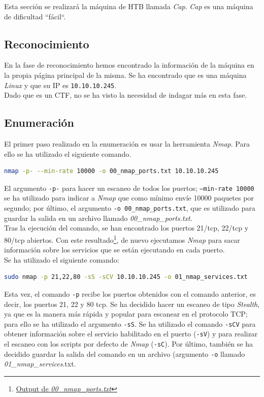 Esta sección se realizará la máquina de \acrlong{HTB} llamada \textit{Cap}\cite{cap}. \textit{Cap} es una máquina de dificultad ``fácil``.

\subsection{Reconocimiento}
En la fase de reconocimiento hemos encontrado la información de la máquina en la propia página principal\cite{cap} de la misma. Se ha encontrado que es una máquina \textit{Linux} y que su IP es \texttt{10.10.10.245}.\\

Dado que es un \acrshort{CTF}, no se ha visto la necesidad de indagar más en esta fase.

\subsection{Enumeración}
El primer paso realizado en la enumeración es usar la herramienta \textit{Nmap}\cite{nmap}. Para ello se ha utilizado el siguiente comando.
\begin{lstlisting}[language=bash]
nmap -p- --min-rate 10000 -o 00_nmap_ports.txt 10.10.10.245
\end{lstlisting}
El argumento \texttt{-p-} para hacer un escaneo de todos los puertos; \texttt{--min-rate 10000} se ha utilizado para indicar a \textit{Nmap} que como mínimo envíe 10000 paquetes por segundo; por último, el argumento \texttt{-o 00\_nmap\_ports.txt}, que es utilizado para guardar la salida en un archivo llamado \textit{00\_nmap\_ports.txt}.\\

Tras la ejecución del comando, se han encontrado los puertos 21/\acrshort{tcp}, 22/\acrshort{tcp} y 80/\acrshort{tcp} abiertos. Con este resultado\footnote{\href{https://github.com/VictorNS69/TFM/blob/main/machines/cap/00_nmap_ports.txt}{Output de \textit{00\_nmap\_ports.txt}}}, de nuevo ejecutamos \textit{Nmap} para sacar información sobre los servicios que se están ejecutando en cada puerto.\\

Se ha utilizado el siguiente comando:
\begin{lstlisting}[language=bash]
sudo nmap -p 21,22,80 -sS -sCV 10.10.10.245 -o 01_nmap_services.txt
\end{lstlisting}

Esta vez, el comando \texttt{-p} recibe los puertos obtenidos con el comando anterior, es decir, los puertos 21, 22 y 80 \acrshort{tcp}. Se ha decidido hacer un escaneo de tipo \textit{Stealth}, ya que es la manera más rápida y popular para escanear en el protocolo TCP; para ello se ha utilizado el argumento \texttt{-sS}. Se ha utilizado el comando \texttt{-sCV} para obtener información sobre el servicio habilitado en el puerto (\texttt{-sV}) y para realizar el escaneo con los scripts por defecto de \textit{Nmap} (\texttt{-sC}). Por último, también se ha decidido guardar la salida del comando en un archivo (argumento \texttt{-o} llamado \textit{01\_nmap\_services}.txt.\\

